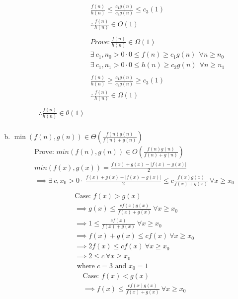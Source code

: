 \documentclass[12pt]{article}
\begin{document}
\begin{enumerate}[(a)]
\begin{align*}
    \\
    &\frac{f(n)}{h(n)} \leq \frac{c_1g(n)}{c_2g(n)} \leq c_3(1)\\
    &\therefore \frac{f(n)}{h(n)} \in O(1)\\
    \\
    &Prove: \frac{f(n)}{h(n)} \in \Omega(1)\\
    &\exists \  c_1, n_0 > 0 \cdot 0 \leq f(n) \geq c_1g(n) \  \ \forall n \geq n_0 \\
    &\exists \  c_1, n_1 > 0 \cdot 0 \leq h(n) \geq c_2g(n) \  \ \forall n \geq n_1 \\
    \\
    &\frac{f(n)}{h(n)} \geq \frac{c_1g(n)}{c_2g(n)} \geq c_3(1)\\
    &\therefore \frac{f(n)}{h(n)} \in \Omega(1)\\
    \\
    \therefore \frac{f(n)}{h(n)} \in \theta(1)\\
  \end{align*}
\item $\min(f(n),g(n)) \in \Theta\left (\frac{f(n)g(n)}{f(n)+g(n)}\right)$\\
\begin{align*}
  &\text{Prove: } min(f(n), g(n)) \in O(\frac{f(n)g(n)}{f(n)+g(n)})\\
  &min(f(x),g(x)) = \frac{f(x) + g(x) - |f(x) - g(x)|}{2}\\
  &\implies \exists \  c, x_0 > 0 \cdot \  \frac{f(x) + g(x) - |f(x) - g(x)|}{2} \leq c \frac{f(x)g(x)}{f(x) + g(x)} \ \forall x \geq x_0\\
\end{align*}
\begin{align*}
  &\text{Case: } f(x) > g(x)\\
  &\implies g(x) \leq \frac{cf(x)g(x)}{f(x) + g(x)} \ \forall x \geq x_0\\
  &\implies 1 \leq \frac{cf(x)}{f(x) + g(x)} \ \forall x \geq x_0\\
  &\implies f(x) + g(x) \leq cf(x) \ \forall x \geq x_0\\
  &\implies 2f(x) \leq cf(x) \ \forall x \geq x_0\\
  &\implies 2 \leq c \ \forall x \geq x_0\\
  &\text{ where } c = 3 \text{ and } x_0 = 1
\end{align*}
\begin{align*}
  &\text{Case: } f(x) < g(x)\\
  &\implies f(x) \leq \frac{cf(x)g(x)}{f(x) + g(x)} \ \forall x \geq x_0\\

\end{align*}
\end{enumerate}
\end{document}
